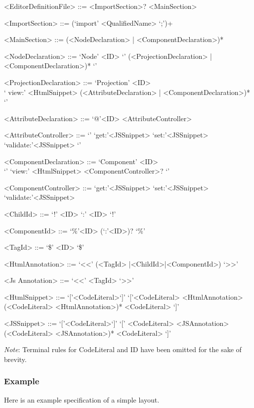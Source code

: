 \documentclass{report}
\begin{document}
\begin{grammar}

<EditorDefinitionFile> ::= <ImportSection>? <MainSection>

<ImportSection> ::= (`import' <QualifiedName> `;')+ 

<MainSection> ::= (<NodeDeclaration> | <ComponentDeclaration>)*

<NodeDeclaration> ::= `Node' <ID> `{' (<ProjectionDeclaration> | <ComponentDeclaration>)* `}'

<ProjectionDeclaration> ::= `Projection' <ID> \\ `{ view:' <HtmlSnippet> (<AttributeDeclaration> | <ComponentDeclaration>)* `}'

<AttributeDeclaration> ::= `@'<ID> <AttributeController>

<AttributeController> ::= `{' `get:'<JSSnippet> `set:'<JSSnippet> `validate:'<JSSnippet> `}'

<ComponentDeclaration> ::= `Component' <ID> \\`{' `view:' <HtmlSnippet> <ComponentController>? `}'

<ComponentController> ::= `get:'<JSSnippet> `set:'<JSSnippet> `validate:'<JSSnippet> 
 
<ChildId> ::= `!' <ID> `:' <ID> `!'
 
<ComponentId> ::= `\%'<ID> (`:'<ID>)? `\%'

<TagId> ::= `\$' <ID> `\$' 

<HtmlAnnotation> ::= `<<' (<TagId> |<ChildId>|<ComponentId>) `>>'

<Js	Annotation> ::= `<<' <TagId> `>>'

<HtmlSnippet> ::= `['<CodeLiteral>`]'
\alt `['<CodeLiteral> <HtmlAnnotation> (<CodeLiteral> <HtmlAnnotation>)*  <CodeLiteral> `]'

<JSSnippet> ::= `['<CodeLiteral>`]'
\alt `[' <CodeLiteral> <JSAnnotation> (<CodeLiteral> <JSAnnotation>)*  <CodeLiteral> `]'


\end{grammar}

\emph{Note}: Terminal rules for CodeLiteral and ID have been omitted for the sake of brevity.

\subsubsection{Example}
Here is an example specification of a simple layout.
\end{document}
